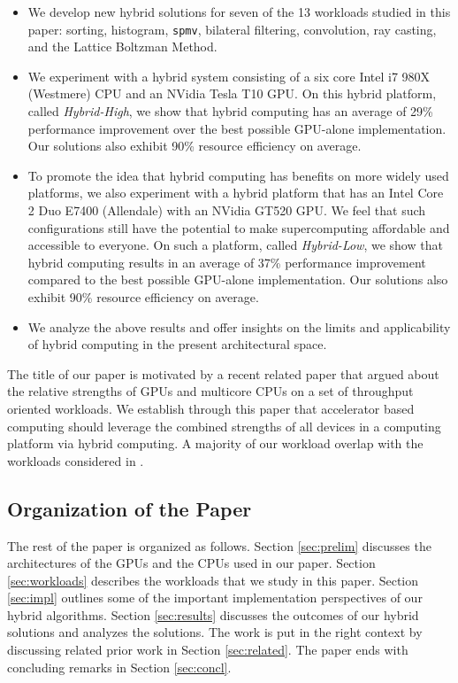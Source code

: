 \documentclass[11pt]{article}
\newcommand{\spmv} {{\tt spmv}}
\begin{document}
\begin{itemize}

\item We develop new hybrid solutions for seven of the 13 workloads studied
in this paper: sorting,
histogram, \spmv, bilateral filtering, convolution, ray casting, and
the Lattice Boltzman Method. 

\item We experiment with a hybrid system consisting of a six core Intel
i7 980X (Westmere) CPU and an NVidia Tesla T10 GPU. On this hybrid platform, called
{\em Hybrid-High}, we show
that hybrid computing has an average of 29\% performance improvement
over the best possible GPU-alone implementation. Our solutions also
exhibit 90\% resource efficiency on average.

\item To promote the idea that hybrid computing has benefits on 
more widely used platforms, we also experiment with a hybrid
platform that has an Intel Core 2 Duo E7400 (Allendale) with an NVidia GT520 GPU. 
We feel that such configurations still have the potential to make
supercomputing affordable and accessible to everyone. On such a platform, called {\em Hybrid-Low}, we show that hybrid computing
results in an average of
37\% performance improvement compared to the best possible GPU-alone
implementation.  Our solutions also exhibit 90\% resource efficiency on average.


\item We analyze the above results and offer insights on the limits and
applicability of hybrid computing in the present architectural space. 
\end{itemize}

The title of our paper is
motivated by a recent related paper \cite{isca10} that argued about the relative
strengths of GPUs and multicore CPUs on a set of throughput oriented
workloads.  We establish through this paper that accelerator based
computing should leverage the combined strengths of all devices in a
computing platform via hybrid computing. A majority of our workload overlap
with the workloads considered in \cite{isca10}. 



\subsection{Organization of the Paper}
The rest of the paper is organized as follows. Section \ref{sec:prelim}
discusses the architectures of the GPUs and the CPUs used in our paper. 
Section \ref{sec:workloads} describes the workloads that we study in this
paper. Section \ref{sec:impl} outlines some of the important implementation
perspectives of our hybrid algorithms. Section \ref{sec:results} discusses
the outcomes of our hybrid solutions and analyzes the solutions. The work
is put in the right context by discussing related prior work in Section
\ref{sec:related}. The paper
ends with concluding remarks in Section \ref{sec:concl}.
\end{document}
